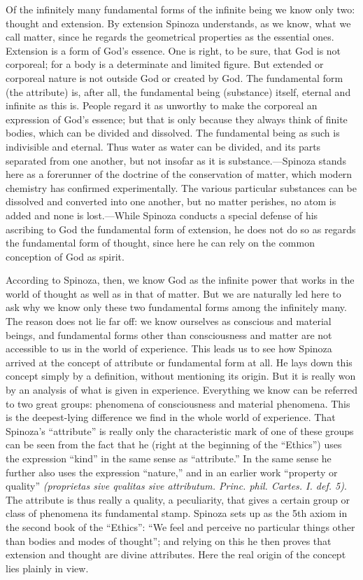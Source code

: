 \documentclass[12pt]{book}
\newcommand{\opage}[1]{\marginnote{\footnotesize\textit{[#1]}}}
\begin{document}
Of the infinitely many fundamental forms of the infinite being we know only two:
thought and extension. By extension Spinoza understands, as we know, what we call
matter, since he regards the geometrical properties as the essential ones. Extension is
a form of God's essence. One is right, to be sure, that God is not corporeal; for a body
is a determinate and limited figure. But extended or corporeal nature is not outside
God or created by God. The fundamental form (the attribute) is, after all, the
fundamental being (substance) itself, eternal and infinite as this is. People regard it
as unworthy to make the corporeal an expression of God's essence; but that is only
because they always think \opage{75}of finite bodies, which can be divided and
dissolved. The fundamental being as such is indivisible and eternal. Thus water as
water can be divided, and its parts separated from one another, but not insofar as it
is substance.---Spinoza stands here as a forerunner of the doctrine of the conservation
of matter, which modern chemistry has confirmed experimentally. The various particular
substances can be dissolved and converted into one another, but no matter perishes, no
atom is added and none is lost.---While Spinoza conducts a special defense of his
ascribing to God the fundamental form of extension, he does not do so as regards the
fundamental form of thought, since here he can rely on the common conception of God as
spirit.

According to Spinoza, then, we know God as the infinite power that works in the world
of thought as well as in that of matter. But we are naturally led here to ask why we
know only these two fundamental forms among the infinitely many. The reason does not lie
far off: we know ourselves as conscious and material beings, and fundamental forms other
than consciousness and matter are not accessible to us in the world of experience. This
leads us to see how Spinoza arrived at the concept of attribute or fundamental form at
all. He lays down this concept simply by a definition, without mentioning its origin.
But it is really won by an analysis of what is given in experience. Everything we know
can be referred to two great groups: phenomena of consciousness and material phenomena.
This is the deepest-lying difference we find in the whole world of experience. That
Spinoza's ``attribute'' is really only the characteristic mark \opage{76}of one of these
groups can be seen from the fact that he (right at the beginning of the ``Ethics'') uses
the expression ``kind'' in the same sense as ``attribute.'' In the same sense he
further also uses the expression ``nature,'' and in an earlier work ``property or
quality'' \textit{(proprietas sive qvalitas sive attributum. Princ. phil. Cartes. I.
def. 5)}. The attribute is thus really a quality, a peculiarity, that gives a certain
group or class of phenomena its fundamental stamp. Spinoza sets up as the 5th axiom in
the second book of the ``Ethics'': ``We feel and perceive no particular things other
than bodies and modes of thought''; and relying on this he then proves that extension
and thought are divine attributes. Here the real origin of the concept lies plainly in
view.
\end{document}
